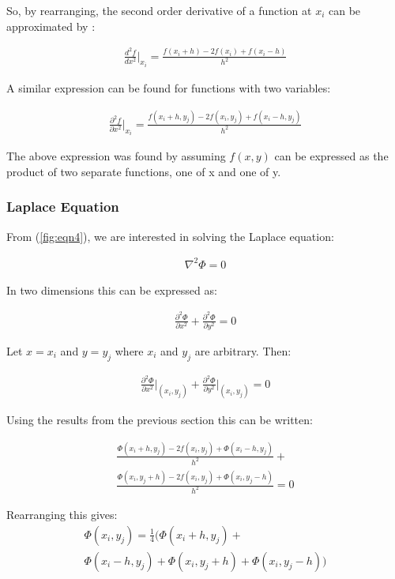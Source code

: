 \documentclass[aps,twocolumn,pre,nofootinbib,10pt]{revtex4-1}
\begin{document}
So, by rearranging, the second order derivative of a function at \(x_i\) can be approximated by \cite{math_meth}:

\begin{gather*}
\frac{d^2f}{dx^2}\Bigg|_{x_i} = \frac{f(x_i+h)-2f(x_i)+f(x_i-h)}{h^2}
\end{gather*}

A similar expression can be found for functions with two variables:

\begin{gather*}
\frac{\partial^2f}{\partial x^2}\Bigg|_{x_i} = \frac{f(x_i+h,y_j)-2f(x_i,y_j)+f(x_i-h,y_j)}{h^2}
\end{gather*}

The above expression was found by assuming $f(x,y)$ can be expressed as the product of two separate functions, one of x and one of y. \\


\subsubsection{Laplace Equation}

From (\ref{fig:eqn4}), we are interested in solving the Laplace equation:

\begin{gather*}
\nabla^2\Phi = 0
\end{gather*}

In two dimensions this can be expressed as:

\begin{gather*}
\frac{\partial^2\Phi}{\partial x^2} + \frac{\partial^2\Phi}{\partial y^2} = 0
\end{gather*}

Let \(x=x_i\) and \(y=y_j\) where \(x_i\) and \(y_j\) are arbitrary. Then:

\begin{gather*}
\frac{\partial^2\Phi}{\partial x^2}\Bigg|_{(x_{i},y_{j})} + \frac{\partial^2\Phi}{\partial y^2}\Bigg|_{(x_{i},y_{j})} = 0
\end{gather*}

Using the results from the previous section this can be written:

\begin{gather*}
\frac{\Phi(x_i+h,y_j)-2f(x_i,y_j)+\Phi(x_i-h,y_j)}{h^2}+ \\
\frac{\Phi(x_i,y_j+h)-2f(x_i,y_j)+\Phi(x_i,y_j-h)}{h^2}=0
\end{gather*}

Rearranging this gives:
\begin{gather*}
\Phi(x_i,y_j)=\frac{1}{4}\Bigg(\Phi(x_i+h,y_j)+ \\
\Phi(x_i-h,y_j)+\Phi(x_i,y_j+h)+\Phi(x_i,y_j-h)\Bigg)
\end{gather*}
\end{document}
